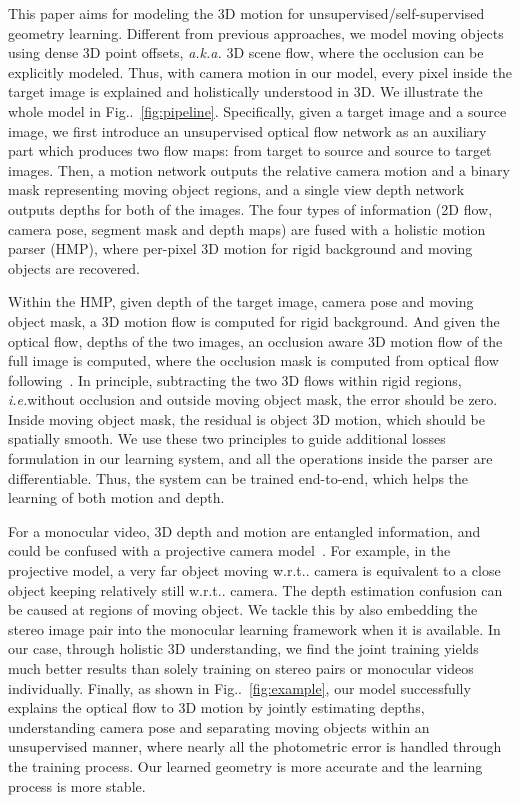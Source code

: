 \documentclass[runningheads]{llncs}
\makeatletter
\newcommand{\figref}[1]{Fig\onedot~\ref{#1}}
\DeclareRobustCommand\onedot{\futurelet\@let@token\@onedot}
\def\onedot{\ifx\@let@token.\else.\null\fi\xspace}
\def\ie{\emph{i.e.}}
\def\wrt{w.r.t\onedot}
\makeatother
\begin{document}
This paper aims for modeling the 3D motion for unsupervised/self-supervised geometry learning. Different from previous approaches, we model moving objects using dense 3D point offsets, \textit{a.k.a.} 3D scene flow, where the occlusion can be explicitly modeled. Thus, with camera motion in our model, every pixel inside the target image is explained and holistically understood in 3D.
We illustrate the whole model in \figref{fig:pipeline}. Specifically, given a target image and a source image, we first introduce an unsupervised optical flow network as an auxiliary part which produces two flow maps: from target to source and source to target images. Then, a motion network outputs the relative camera motion and a binary mask representing moving object regions, and a single view depth network outputs depths for both of the images. The four types of information (2D flow, camera pose, segment mask and depth maps) are fused with a holistic motion parser (HMP), where per-pixel 3D motion for rigid background and moving objects are recovered. 

Within the HMP, given depth of the target image, camera pose and moving object mask, a 3D motion flow is computed for rigid background. 
And given the optical flow, depths of the two images, an occlusion aware 3D motion flow of the full image is computed, where the occlusion mask is computed from optical flow following~\cite{wang2017occlusion}.
In principle, subtracting the two 3D flows within rigid regions, \ie without occlusion and outside moving object mask, the error should be zero. Inside moving object mask, the residual is object 3D motion, which should be spatially smooth. 
We use these two principles to guide additional losses formulation in our learning system, and all the operations inside the parser are differentiable. Thus, the system can be trained end-to-end, which helps the learning of both motion and depth.

For a monocular video, 3D depth and motion are entangled information, and could be confused with a projective camera model~\cite{torresani2008nonrigid}. For example, in the projective model, a very far object moving \wrt camera is equivalent to a close object keeping relatively still \wrt camera. The depth estimation confusion can be caused at regions of moving object.
We tackle this by also embedding the stereo image pair into the monocular learning framework when it is available. 
In our case, through holistic 3D understanding, we find the joint training yields much better results than solely training on stereo pairs or monocular videos individually.
Finally, as shown in \figref{fig:example}, our model successfully explains the optical flow to 3D motion by jointly estimating depths, understanding camera pose and separating moving objects within an unsupervised manner, where nearly all the photometric error is handled through the training process. Our learned geometry is more accurate and the learning process is more stable. 
\end{document}
